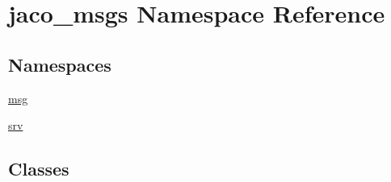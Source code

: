 \hypertarget{namespacejaco__msgs}{}\section{jaco\+\_\+msgs Namespace Reference}
\label{namespacejaco__msgs}
\subsection*{Namespaces}
\begin{DoxyCompactItemize}
\item 
 \hyperlink{namespacejaco__msgs_1_1msg}{msg}
\item 
 \hyperlink{namespacejaco__msgs_1_1srv}{srv}
\end{DoxyCompactItemize}
\subsection*{Classes}
